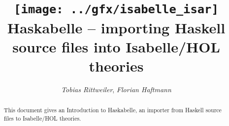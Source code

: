 \documentclass[12pt,a4paper,fleqn]{report}
\title{\texttt{[image: ../gfx/isabelle\_isar]}
  \\[4ex] Haskabelle -- importing Haskell source files into Isabelle/HOL theories}
\author{\emph{Tobias Rittweiler}, \emph{Florian Haftmann}}
\begin{document}
\maketitle

\begin{abstract}
  This document gives an Introduction to Haskabelle, an importer from
  Haskell source files to Isabelle/HOL theories.
\end{abstract}

\thispagestyle{empty}\clearpage

\clearfirst



\begingroup
 \small\raggedright\frenchspacing

\endgroup
\end{document}
